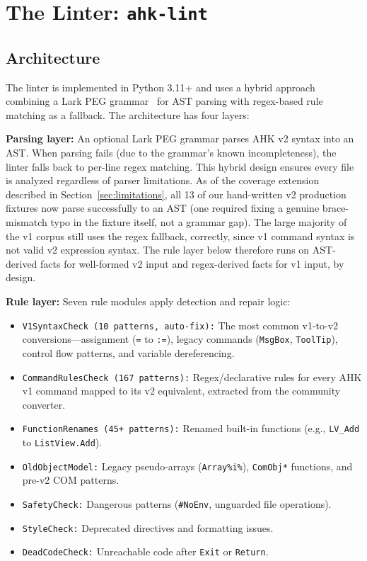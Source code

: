 \documentclass[11pt,a4paper]{article}
\begin{document}
\section{The Linter: \texttt{ahk-lint}}

\subsection{Architecture}

The linter is implemented in Python 3.11+ and uses a hybrid approach combining a Lark PEG grammar~\cite{lark} for AST parsing with regex-based rule matching as a fallback. The architecture has four layers:

\textbf{Parsing layer:} An optional Lark PEG grammar parses AHK v2 syntax into an AST. When parsing fails (due to the grammar's known incompleteness), the linter falls back to per-line regex matching. This hybrid design ensures every file is analyzed regardless of parser limitations. As of the coverage extension described in Section~\ref{sec:limitations}, all 13 of our hand-written v2 production fixtures now parse successfully to an AST (one required fixing a genuine brace-mismatch typo in the fixture itself, not a grammar gap). The large majority of the v1 corpus still uses the regex fallback, correctly, since v1 command syntax is not valid v2 expression syntax. The rule layer below therefore runs on AST-derived facts for well-formed v2 input and regex-derived facts for v1 input, by design.

\textbf{Rule layer:} Seven rule modules apply detection and repair logic:

\begin{itemize}
  \item \texttt{V1SyntaxCheck (10 patterns, auto-fix):} The most common v1-to-v2 conversions---assignment (\texttt{=} to \texttt{:=}), legacy commands (\texttt{MsgBox}, \texttt{ToolTip}), control flow patterns, and variable dereferencing.
  \item \texttt{CommandRulesCheck (167 patterns):} Regex/declarative rules for every AHK v1 command mapped to its v2 equivalent, extracted from the community converter.
  \item \texttt{FunctionRenames (45+ patterns):} Renamed built-in functions (e.g., \texttt{LV\_Add} to \texttt{ListView.Add}).
  \item \texttt{OldObjectModel:} Legacy pseudo-arrays (\texttt{Array\%i\%}), \texttt{ComObj*} functions, and pre-v2 COM patterns.
  \item \texttt{SafetyCheck:} Dangerous patterns (\texttt{\#NoEnv}, unguarded file operations).
  \item \texttt{StyleCheck:} Deprecated directives and formatting issues.
  \item \texttt{DeadCodeCheck:} Unreachable code after \texttt{Exit} or \texttt{Return}.
\end{itemize}
\end{document}
